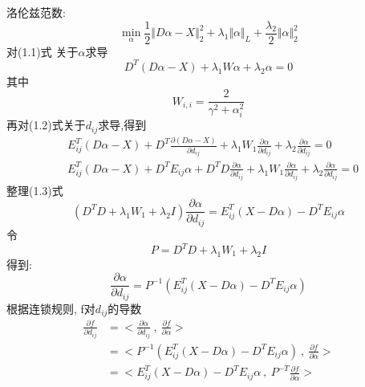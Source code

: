 \documentclass[245.0pt]{article}
\begin{document}
洛伦兹范数:
\begin{equation*}
\min \limits_{\alpha} \frac{1}{2} \Vert D \alpha - X \Vert_{2}^{2} + \lambda_{1}\Vert\alpha \Vert_{L}  + \frac{\lambda_{2}}{2} \Vert \alpha \Vert_{2}^{2} \tag{1.1}
\end{equation*}
对(1.1)式 关于$\alpha$求导
\begin{equation*}
D^{T} ( D \alpha - X ) + \lambda_{1} W \alpha + \lambda_{2} \alpha = 0 \tag{1.2}
\end{equation*}
%
其中
\begin{equation*}
W_{i,i} = \frac{2}{\gamma^{2} + \alpha_{i}^{2}}
\end{equation*}
%
再对(1.2)式关于$d_{ij}$求导,得到
\begin{equation*}
\begin{split}
&E_{ij}^{T} ( D \alpha - X ) +  D^{T} \frac{\partial ( D\alpha - X )}{\partial d_{ij}} + \lambda_{1} W_{1} \frac{\partial \alpha}{\partial d_{ij}} + \lambda_{2} \frac{\partial \alpha}{\partial d_{ij}} = 0 \\
&E_{ij}^{T} ( D \alpha - X ) + D^{T} E_{ij} \alpha + D^{T} D \frac{\partial \alpha}{\partial d_{ij}} + \lambda_{1} W_{1} \frac{\partial \alpha}{\partial d_{ij}} + \lambda_{2} \frac{\partial \alpha}{\partial d_{ij}} = 0 
\end{split}
\tag{1.3}
\end{equation*}
%
整理(1.3)式
\begin{equation*}
( D^{T} D + \lambda_{1} W_{1} + \lambda_{2} I ) \frac{\partial \alpha}{\partial d_{ij}} = E_{ij}^{T} ( X - D \alpha ) - D^{T} E_{ij} \alpha 
\tag{1.4}
\end{equation*}
%
令
\begin{equation*}
P = D^{T} D + \lambda_{1} W_{1} + \lambda_{2} I 
\end{equation*} 
得到:
\begin{equation*}
\frac{\partial \alpha}{\partial d_{ij}} = P^{-1} ( E_{ij}^{T} ( X - D \alpha ) - D^{T} E_{ij} \alpha )\tag{1.5}
\end{equation*}
根据连锁规则, f对$d_{ij}$的导数
\begin{equation*}
\begin{split}
\frac{\partial f}{\partial d_{ij}} &= < \frac{\partial \alpha}{\partial d_{ij}} \ , \ \frac{\partial f}{\partial \alpha} > \\ %
&= < P^{-1} ( E_{ij}^{T} ( X - D \alpha ) - D^{T} E_{ij} \alpha ) \ , \ \frac{\partial f }{\partial \alpha} > \\
&= < E_{ij}^{T} ( X - D \alpha ) - D^{T} E_{ij} \alpha \ , \ P^{-T} \frac{\partial f}{\partial \alpha} >
\end{split} \tag{1.6}
\end{equation*}
\end{document}

